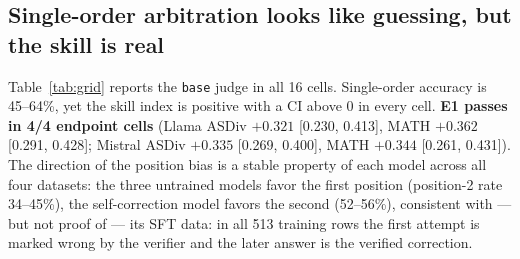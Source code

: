\documentclass[11pt]{article}
\begin{document}
\subsection{Single-order arbitration looks like guessing, but the skill is real}
Table~\ref{tab:grid} reports the \texttt{base} judge in all 16 cells. Single-order accuracy is 45--64\%, yet
the skill index is positive with a CI above 0 in every cell. \textbf{E1 passes in 4/4 endpoint cells}
(Llama ASDiv $+0.321$ [0.230, 0.413], MATH $+0.362$ [0.291, 0.428]; Mistral ASDiv $+0.335$ [0.269, 0.400],
MATH $+0.344$ [0.261, 0.431]). The direction of the position bias is a stable property of each model across
all four datasets: the three untrained models favor the first position (position-2 rate 34--45\%), the
self-correction model favors the second (52--56\%), consistent with --- but not proof of --- its SFT data: in all
513 training rows the first attempt is marked wrong by the verifier and the later answer is the verified correction.
\end{document}
